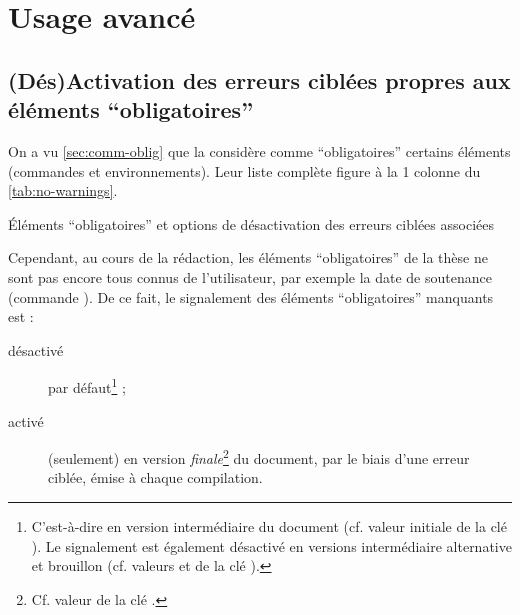 \chapter{Usage avancé}\label{cha:usage-avance}

\section{(Dés)Activation des erreurs ciblées propres aux éléments
  \enquote{obligatoires}}\label{sec:desact-des-erre}

On a vu \vref{sec:comm-oblig} que la \yatcl{} considère comme
\enquote{obligatoires} certains éléments (commandes et environnements). Leur
liste complète figure à la 1\iere{} colonne du \vref{tab:no-warnings}.
\begin{table}[ht]
  \centering
  
  \caption{Éléments \enquote{obligatoires} et options de désactivation des erreurs
    ciblées associées}
  \label{tab:no-warnings}
\end{table}

Cependant, au cours de la rédaction, les éléments \enquote{obligatoires} de la
thèse ne sont pas encore tous connus de l'utilisateur, par exemple la date de
soutenance (commande ).
De ce fait, le signalement des éléments \enquote{obligatoires} manquants est :
\begin{description}
\item[désactivé] par défaut\footnote{C'est-à-dire en version intermédiaire du
    document (cf. valeur initiale  de la clé
    ). Le signalement est également désactivé en versions
    intermédiaire alternative et brouillon (cf. valeurs 
    et  de la clé ).} ;
\item[activé] (seulement) en version \emph{finale}\footnote{Cf. valeur
     de la clé .} du document, par le biais
  d'une erreur ciblée, émise à chaque compilation.
\end{description}

